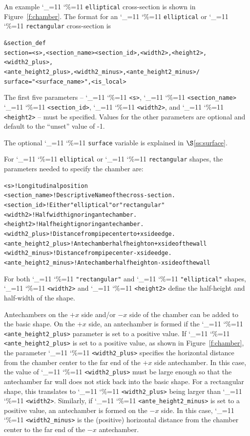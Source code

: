 \documentclass[11pt,openany]{report}
\newcommand{\sref}[1]{$\S$\ref{#1}}
\newcommand\ttcmd{\begingroup\catcode`\_=11 \catcode`\%=11 \dottcmd}
\newcommand\dottcmd[1]{\texttt{#1}\endgroup}
\newcommand{\fig}[1]{Figure~\ref{#1}}
\newcommand{\vn}{\ttcmd}
\newlength{\ExBeg}
\newlength{\ExEnd}
\newenvironment{example}
  {\vspace{\ExBeg} \begin{alltt}}
  {\end{alltt} \vspace{\ExEnd}}
\begin{document}
An example \vn{elliptical} cross-section is shown in
\fig{f:chamber}. The format for an \vn{elliptical} or \vn{rectangular}
cross-section is
\begin{example}
  &section_def 
    section = <s>, <section_name> <section_id>, <width2>, <height2>, <width2_plus>, 
              <ante_height2_plus>, <width2_minus>, <ante_height2_minus> /
    surface = "<surface_name>", <is_local>
\end{example}
The first five parameters -- \vn{<s>}, \vn{<section_name>}
\vn{<section_id>}, \vn{<width2>}, and \vn{<height2>} -- must be
specified. Values for the other parameters are optional and default to
the ``unset'' value of -1.

The optional \vn{surface} variable is explained in \sref{ss:surface}.

For \vn{elliptical} or \vn{rectangular} shapes, the
parameters needed to specify the chamber are:
\begin{example}
  <s>                   ! Longitudinal position
  <section_name>        ! Descriptive Name of the cross-section.
  <section_id>          ! Either "elliptical" or "rectangular"
  <width2>              ! Half width ignoring antechamber.
  <height2>             ! Half height ignoring antechamber.
  <width2_plus>         ! Distance from pipe center to +x side edge.
  <ante_height2_plus>   ! Antechamber half height on +x side of the wall
  <width2_minus>        ! Distance from pipe center -x side edge.
  <ante_height2_minus>  ! Antechamber half height on -x side of the wall
\end{example}

For both \vn{"rectangular"} and \vn{"elliptical"} shapes, \vn{<width2>}
and \vn{<height2>} define the half-height and half-width of the shape.

Antechambers on the $+x$ side and/or $-x$ side of the chamber can be
added to the basic shape. On the $+x$ side, an antechamber is formed
if the \vn{<ante_height2_plus>} parameter is set to a positive value. If
\vn{<ante_height2_plus>} is set to a positive value, as shown in
\fig{f:chamber}, the parameter \vn{<width2_plus>} specifies the
horizontal distance from the chamber center to the far end of the $+x$
side antechamber. In this case, the value of \vn{<width2_plus>} must be
large enough so that the antechamber far wall does not stick back into
the basic shape. For a rectangular shape, this translates to
\vn{<width2_plus>} being larger than \vn{<width2>}. Similarly, if
\vn{<ante_height2_minus>} is set to a positive value, an antechamber is
formed on the $-x$ side.  In this case, \vn{<width2_minus>} is the
(positive) horizontal distance from the chamber center to the far end
of the $-x$ antechamber.
\end{document}
